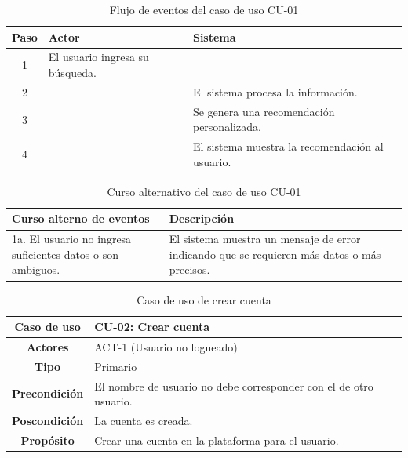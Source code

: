 \begin{table}[H]
\centering
\begin{tabular}{|c|p{5cm}|p{5cm}|}
\hline
\rowcolor{green!40} \textbf{Paso} & \textbf{Actor} & \textbf{Sistema} \\ \hline
\rowcolor{blue!10} 1 & El usuario ingresa su búsqueda. & \\ \hline
\rowcolor{blue!10} 2 & & El sistema procesa la información. \\ \hline
\rowcolor{blue!10} 3 & & Se genera una recomendación personalizada. \\ \hline
\rowcolor{blue!10} 4 & & El sistema muestra la recomendación al usuario. \\ \hline
\end{tabular}
\caption{Flujo de eventos del caso de uso CU-01}
\end{table}

\begin{table}[H]
\centering
\begin{tabular}{|p{4cm}|p{8cm}|}
\hline
\rowcolor{green!40} \textbf{Curso alterno de eventos} & \textbf{Descripción} \\ \hline
\rowcolor{blue!10} 1a. El usuario no ingresa suficientes datos o son ambiguos. & El sistema muestra un mensaje de error indicando que se requieren más datos o más precisos. \\ \hline
\end{tabular}
\caption{Curso alternativo del caso de uso CU-01}
\end{table}

\begin{table}[H]
\centering
\begin{tabular}{|c|p{10cm}|}
\hline
\rowcolor{green!40} \textbf{Caso de uso} & CU-02: Crear cuenta \\ \hline
\rowcolor{blue!10} \textbf{Actores} & ACT-1 (Usuario no logueado) \\ \hline
\rowcolor{blue!10} \textbf{Tipo} & Primario \\ \hline
\rowcolor{blue!10} \textbf{Precondición} & El nombre de usuario no debe corresponder con el de otro usuario. \\ \hline
\rowcolor{blue!10} \textbf{Poscondición} & La cuenta es creada. \\ \hline
\rowcolor{blue!10} \textbf{Propósito} & Crear una cuenta en la plataforma para el usuario. \\ \hline
\end{tabular}
\caption{Caso de uso de crear cuenta}
\end{table}

